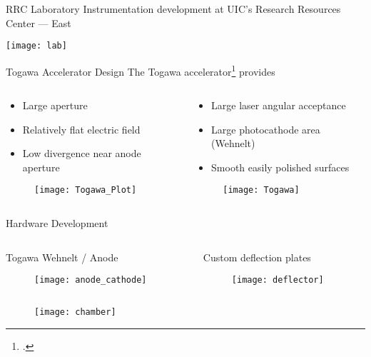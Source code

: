 \begin{frame}{RRC Laboratory}
  Instrumentation development at UIC's Research Resources Center --- East
  \begin{center}
    \texttt{[image: lab]}
  \end{center}
\end{frame}

\begin{frame}{Togawa Accelerator Design}
  The Togawa accelerator\footcite{togawa_ceb6_2007} provides
  \begin{columns}
    \begin{column}{0.49\linewidth}
      \begin{itemize}
        \item<2-> Large aperture
        \item<3-> Relatively flat electric field
        \item<4-> Low divergence near anode aperture
      \end{itemize}
      \begin{figure}
        \centering
        \texttt{[image: Togawa\_Plot]}
      \end{figure}
    \end{column}
    \begin{column}{0.49\linewidth}
      \begin{itemize}
        \item<5-> Large laser angular acceptance
        \item<5-> Large photocathode area (Wehnelt)
        \item<5-> Smooth easily polished surfaces
      \end{itemize}
      \begin{figure}
        \centering
        \texttt{[image: Togawa]}
      \end{figure}
    \end{column}
  \end{columns}
\end{frame}

\begin{frame}{Hardware Development}
  \begin{columns}
    \begin{column}{0.49\linewidth}
      Togawa Wehnelt / Anode
      \begin{figure}
        \centering
        \texttt{[image: anode\_cathode]}
      \end{figure}
    \end{column}
    \begin{column}{0.49\linewidth}
      Custom deflection plates
      \begin{figure}
        \centering
        \texttt{[image: deflector]}
      \end{figure}
    \end{column}
  \end{columns}
  \begin{figure}
    \centering
    \texttt{[image: chamber]}
  \end{figure}
\end{frame}

